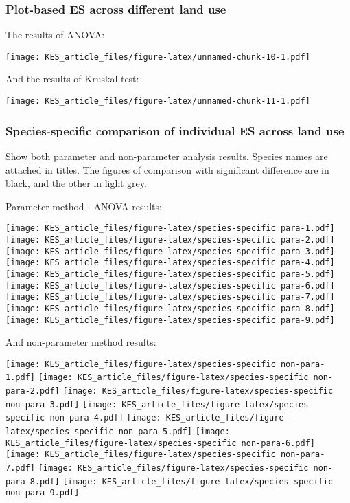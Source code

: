 \documentclass[
]{article}
\begin{document}
\hypertarget{plot-based-es-across-different-land-use}{%
\subsubsection{Plot-based ES across different land use}\label{plot-based-es-across-different-land-use}}

The results of ANOVA:

\texttt{[image: KES\_article\_files/figure-latex/unnamed-chunk-10-1.pdf]}

And the results of Kruskal test:

\texttt{[image: KES\_article\_files/figure-latex/unnamed-chunk-11-1.pdf]}

\hypertarget{species-specific-comparison-of-individual-es-across-land-use}{%
\subsubsection{Species-specific comparison of individual ES across land use}\label{species-specific-comparison-of-individual-es-across-land-use}}

Show both parameter and non-parameter analysis results. Species names are attached in titles. The figures of comparison with significant difference are in black, and the other in light grey.

Parameter method - ANOVA results:

\texttt{[image: KES\_article\_files/figure-latex/species-specific para-1.pdf]} \texttt{[image: KES\_article\_files/figure-latex/species-specific para-2.pdf]} \texttt{[image: KES\_article\_files/figure-latex/species-specific para-3.pdf]} \texttt{[image: KES\_article\_files/figure-latex/species-specific para-4.pdf]} \texttt{[image: KES\_article\_files/figure-latex/species-specific para-5.pdf]} \texttt{[image: KES\_article\_files/figure-latex/species-specific para-6.pdf]} \texttt{[image: KES\_article\_files/figure-latex/species-specific para-7.pdf]} \texttt{[image: KES\_article\_files/figure-latex/species-specific para-8.pdf]} \texttt{[image: KES\_article\_files/figure-latex/species-specific para-9.pdf]}

And non-parameter method results:

\texttt{[image: KES\_article\_files/figure-latex/species-specific non-para-1.pdf]} \texttt{[image: KES\_article\_files/figure-latex/species-specific non-para-2.pdf]} \texttt{[image: KES\_article\_files/figure-latex/species-specific non-para-3.pdf]} \texttt{[image: KES\_article\_files/figure-latex/species-specific non-para-4.pdf]} \texttt{[image: KES\_article\_files/figure-latex/species-specific non-para-5.pdf]} \texttt{[image: KES\_article\_files/figure-latex/species-specific non-para-6.pdf]} \texttt{[image: KES\_article\_files/figure-latex/species-specific non-para-7.pdf]} \texttt{[image: KES\_article\_files/figure-latex/species-specific non-para-8.pdf]} \texttt{[image: KES\_article\_files/figure-latex/species-specific non-para-9.pdf]}
\end{document}
